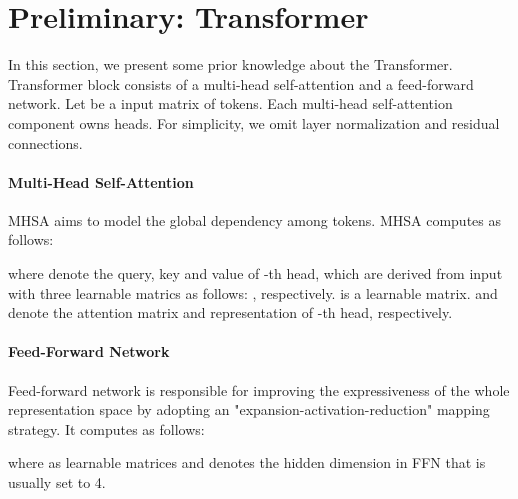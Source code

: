 \documentclass[11pt]{article}
\begin{document}
\section{Preliminary: Transformer}

In this section, we present some prior knowledge about the Transformer.
Transformer block consists of a multi-head self-attention and a feed-forward network. Let  be a  input matrix of  tokens. Each multi-head self-attention component owns  heads. For simplicity, we omit layer normalization and residual connections.

\paragraph{Multi-Head Self-Attention} MHSA aims to model the global dependency among tokens. MHSA computes as follows:

\noindent
where  denote the query, key and value of -th head, which are derived from input with three learnable matrics  as follows: ,  respectively.  is a learnable matrix.  and   denote the attention matrix and representation of -th head, respectively. 



\paragraph{Feed-Forward Network}  Feed-forward network is responsible for improving the expressiveness of the whole representation space by adopting an "expansion-activation-reduction" mapping strategy. It computes as follows:

\noindent where  as learnable matrices and  denotes the hidden dimension in FFN that is usually set to 4.
\end{document}
